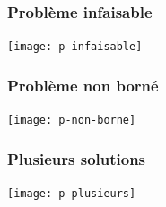 \documentclass{beamer}
\newcommand{\R}{{\ensuremath\mathbb{R}}}
\begin{document}
\begin{frame}
  \frametitle{Problème infaisable}

  \begin{center}
      \texttt{[image: p-infaisable]}    
  \end{center}
  
\end{frame}

\begin{frame}
  \frametitle{Problème non borné}

  \begin{center}
    \texttt{[image: p-non-borne]}    
  \end{center}

\end{frame}

\begin{frame}
  \frametitle{Plusieurs solutions}

  \begin{center}
    \texttt{[image: p-plusieurs]}    
  \end{center}
  
\end{frame}




  
\end{document}
